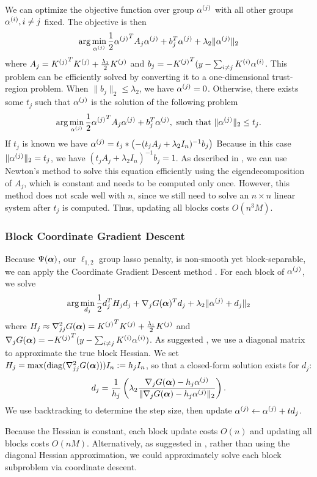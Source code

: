 We can optimize the objective function over group ${\alpha^{(j)}}$ with all other groups
${\alpha^{(i)}}, i \ne j$ fixed. The objective is then
\[
\arg\min_{\alpha^{(j)}} \frac{1}{2}{\alpha^{(j)}}^T A_j {\alpha^{(j)}} + b_j^T {\alpha^{(j)}} + \lambda_2 \|{\alpha^{(j)}}\|_2
\]
where $A_j = {K^{(j)}}^T {K^{(j)}} + \frac{\lambda_1}{2}{K^{(j)}}$ 
and $b_j = -{K^{(j)}}^T (y-\sum_{i\ne j}{{K^{(i)}} {\alpha^{(i)}}}$.
This problem can be efficiently solved \citep{bcd-group-lasso:2013} 
by converting it to a one-dimensional trust-region problem. 
When $\|b_j\|_2 \le \lambda_2$, we have ${\alpha^{(j)}} = 0$. 
Otherwise, there exists some $t_j$ such that ${\alpha^{(j)}}$ is the solution of the following
problem
\[
\arg\min_{\alpha^{(j)}} \frac{1}{2}{\alpha^{(j)}}^T A_j {\alpha^{(j)}} + b_j^T {\alpha^{(j)}}, 
\text{ such that } \|{\alpha^{(j)}}\|_2 \le t_j.
\]
If $t_j$ is known we have ${\alpha^{(j)}} = t_j * \left(-(t_j A_j + \lambda_2 I_n)^{-1} b_j\right)$
Because in this case $\|{\alpha^{(j)}}\|_2 = t_j$, we have $(t_j A_j + \lambda_2 I_n)^{-1} b_j = 1$.
As described in \citet{bcd-group-lasso:2013}, 
we can use Newton's method to solve this equation efficiently 
using the eigendecomposition of $A_j$, which is constant and needs to be computed only once.
However, this method does not scale well with $n$, since we still need
to solve an $n \times n$ linear system after $t_j$ is computed.
Thus, updating all blocks costs $O(n^3 M)$.

\subsubsection*{Block Coordinate Gradient Descent}

Because $\Psi({\bm{\alpha}})$, our $\ell_{1,2}$ group lasso penalty, is non-smooth yet block-separable,
we can apply the Coordinate Gradient Descent method \citep{cgd:2009}.
For each block of ${\alpha^{(j)}}$, we solve
\[
\arg\min_{d_j} \frac{1}{2}d_j^T H_j d_j + \nabla_{j}G({\bm{\alpha}})^T d_j 
+ \lambda_2 \|{\alpha^{(j)}}+d_j\|_2
\]
where $H_j \approx \nabla^2_{jj}G({\bm{\alpha}}) = {K^{(j)}}^T {K^{(j)}} + \frac{\lambda_1}{2}{K^{(j)}}$ 
and $\nabla_j G({\bm{\alpha}}) = -{K^{(j)}}^T (y-\sum_{i\ne j}{{K^{(i)}} {\alpha^{(i)}}})$.
As suggested \citet{cgd:2009}, we use a diagonal matrix to approximate the true block Hessian.
We set $H_j = \max({\rm diag}(\nabla^2_{jj}G({\bm{\alpha}}))) I_n := h_j I_n$, so that a closed-form solution exists
for $d_j$:
\[
d_j = \frac{1}{h_j}\left(\lambda_2 \frac{\nabla_j G({\bm{\alpha}}) - h_j {\alpha^{(j)}}}
{\|\nabla_j G({\bm{\alpha}}) - h_j {\alpha^{(j)}}\|_2}\right).
\]
We use backtracking to determine the step size, then update ${\alpha^{(j)}} \leftarrow {\alpha^{(j)}} + t d_j$.

Because the Hessian is constant, each block update costs $O(n)$ and updating all blocks costs $O(nM)$.
Alternatively, as suggested in \citet{note-group-lasso:2010}, rather than using the 
diagonal Hessian approximation, we could approximately solve each block subproblem via 
coordinate descent.
